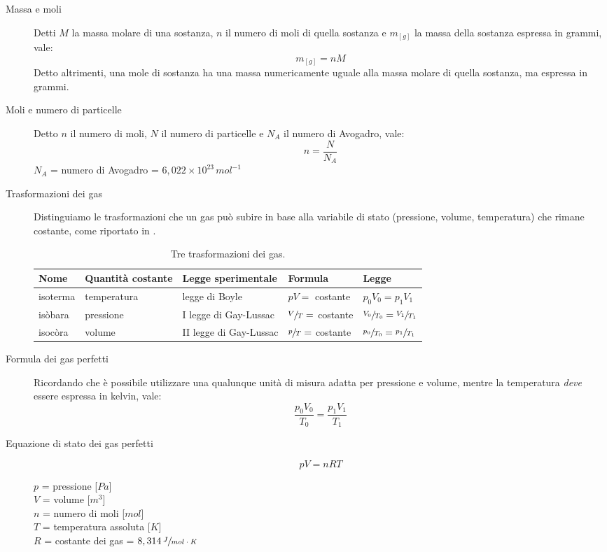 \documentclass[a4paper,11pt,italian]{article}
\begin{document}
\begin{description}
  \item[Massa e moli]
  Detti $ M $ la massa molare di una sostanza, $ n $  il numero di moli di quella sostanza e $ m_{[g]} $ la massa della sostanza espressa in grammi, vale: 
  \[ m_{[g]} = n M \]
  Detto altrimenti, una mole di sostanza ha una massa numericamente uguale alla massa molare di quella sostanza, ma espressa in grammi.
  
  \item[Moli e numero di particelle]
  Detto $ n $ il numero di moli, $ N $ il numero di particelle e $ N_A $ il numero di Avogadro, vale: 
  \[ n = \frac{N}{N_A} \]
  $ N_A $ = numero di Avogadro = $ 6,022 \times 10^{23} \, mol^{-1} $
  
  \item[Trasformazioni dei gas]
  Distinguiamo le trasformazioni che un gas può subire in base alla variabile di stato (pressione, volume, temperatura) che rimane costante, come riportato in .
  
  \begin{table}[htb]\centering
  \begin{tabular}{lllll}\toprule
     \textbf{Nome}  & \textbf{Quantità costante}  & \textbf{Legge sperimentale} & \textbf{Formula}            & \textbf{Legge}\\\midrule
     isoterma       & temperatura             & legge di Boyle              & $ pV= $ costante            & $ p_0V_0 = p_1V_1  $\\\addlinespace[.2em]
     isòbara        & pressione               & I legge di Gay-Lussac       & $ \sfrac{V}{T} = $ costante & $ \sfrac{V_0}{T_0} = \sfrac{V_1}{T_1} $\\\addlinespace[.2em]
     isocòra        & volume                  & II legge di Gay-Lussac      & $ \sfrac{p}{T} = $ costante & $ \sfrac{p_0}{T_0} = \sfrac{p_1}{T_1} $\\\bottomrule
   \end{tabular}
   \caption{Tre trasformazioni dei gas.}
  \label{tab:trasformazioni}
   \end{table}
  
  \item[Formula dei gas perfetti]
  Ricordando che è possibile utilizzare una qualunque unità di misura adatta per pressione e volume, mentre la temperatura \emph{deve} essere espressa in kelvin, vale: 
  \[ \dfrac{p_0 V_0}{T_0} = \dfrac{p_1 V_1}{T_1} \]
  
  \item[Equazione di stato dei gas perfetti]
  \[ pV = nRT \]
  \begin{multicols}{2}
  $ p $ = pressione [$ Pa $]\\
  $ V $ = volume [$ m^3 $]\\
  $ n $ = numero di moli [$ mol $]\\
  $ T $ = temperatura assoluta [$ K $]\\
  $ R $ = costante dei gas = $ 8,314 \, \sfrac{J}{mol \cdot K} $
  \end{multicols}
\end{description}
\end{document}
